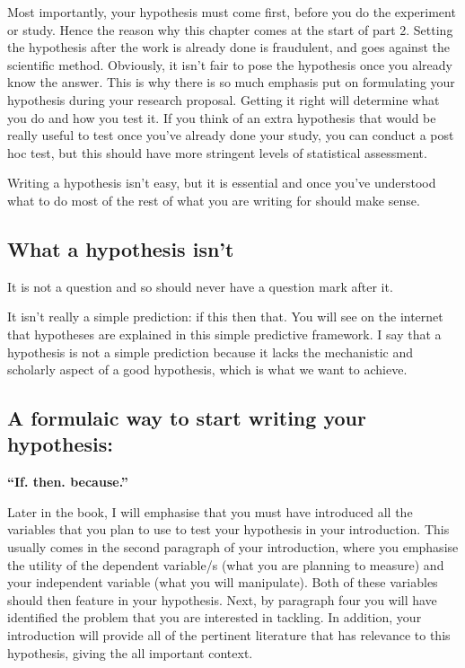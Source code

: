 \documentclass[
]{krantz}
\begin{document}
Most importantly, your hypothesis must come first, before you do the experiment or study. Hence the reason why this chapter comes at the start of part 2. Setting the hypothesis after the work is already done is fraudulent, and goes against the scientific method. Obviously, it isn't fair to pose the hypothesis once you already know the answer. This is why there is so much emphasis put on formulating your hypothesis during your research proposal. Getting it right will determine what you do and how you test it. If you think of an extra hypothesis that would be really useful to test once you've already done your study, you can conduct a post hoc test, but this should have more stringent levels of statistical assessment.

Writing a hypothesis isn't easy, but it is essential and once you've understood what to do most of the rest of what you are writing for should make sense.

\hypertarget{what-a-hypothesis-isnt}{%
\subsection{What a hypothesis isn't}\label{what-a-hypothesis-isnt}}

It is not a question and so should never have a question mark after it.

It isn't really a simple prediction: if this then that. You will see on the internet that hypotheses are explained in this simple predictive framework. I say that a hypothesis is not a simple prediction because it lacks the mechanistic and scholarly aspect of a good hypothesis, which is what we want to achieve.

\hypertarget{a-formulaic-way-to-start-writing-your-hypothesis}{%
\subsection{A formulaic way to start writing your hypothesis:}\label{a-formulaic-way-to-start-writing-your-hypothesis}}

\textbf{``If. then. because.''}

Later in the book, I will emphasise that you must have introduced all the variables that you plan to use to test your hypothesis in your introduction. This usually comes in the second paragraph of your introduction, where you emphasise the utility of the dependent variable/s (what you are planning to measure) and your independent variable (what you will manipulate). Both of these variables should then feature in your hypothesis. Next, by paragraph four you will have identified the problem that you are interested in tackling. In addition, your introduction will provide all of the pertinent literature that has relevance to this hypothesis, giving the all important context.
\end{document}

